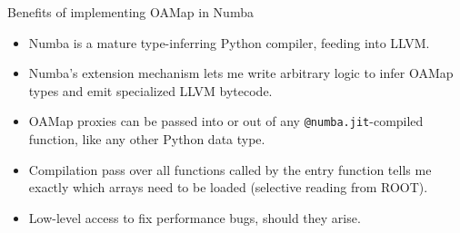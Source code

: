 \documentclass[aspectratio=169]{beamer}
\begin{document}
\begin{frame}{Benefits of implementing OAMap in Numba}
\vspace{0.5 cm} \large
\begin{itemize}\setlength{\itemsep}{0.4 cm}
\item Numba is a mature type-inferring Python compiler, feeding into LLVM.

\item Numba's extension mechanism lets me write arbitrary logic to infer OAMap types and emit specialized LLVM bytecode.

\item OAMap proxies can be passed into or out of any {\tt\small @numba.jit}-compiled function, like any other Python data type.

\item Compilation pass over all functions called by the entry function tells me exactly which arrays need to be loaded (selective reading from ROOT).

\item Low-level access to fix performance bugs, should they arise.
\end{itemize}
\end{frame}
\end{document}
